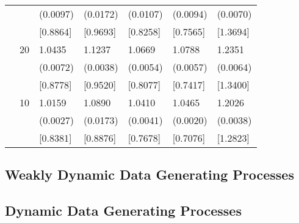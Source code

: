 \begin{table}[H]
{\begin{tabular}{c c | C{2.4cm} | C{2.4cm} | C{2.4cm} | C{2.4cm} | C{2.4cm} }
			&&(0.0097)&(0.0172)&(0.0107)&(0.0094)&(0.0070)\\
			&&[0.8864]&[0.9693]&[0.8258]&[0.7565]&[1.3694]\\
			&20&1.0435&1.1237&1.0669&1.0788&1.2351\\
			&&(0.0072)&(0.0038)&(0.0054)&(0.0057)&(0.0064)\\
			&&[0.8778]&[0.9520]&[0.8077]&[0.7417]&[1.3400]\\
			&10&1.0159&1.0890&1.0410&1.0465&1.2026\\
			&&(0.0027)&(0.0173)&(0.0041)&(0.0020)&(0.0038)\\
			&&[0.8381]&[0.8876]&[0.7678]&[0.7076]&[1.2823]\\
			\bottomrule[1.5pt]
	\end{tabular}}
	\label{table:table S.6}
\end{table}

\subsection{Weakly Dynamic Data Generating Processes}
\subsection{Dynamic Data Generating Processes}